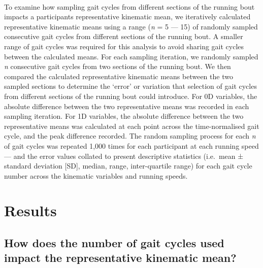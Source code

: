 \documentclass[]{elsarticle} %
\begin{document}
~

To examine how sampling gait cycles from different sections of the
running bout impacts a participants representative kinematic mean, we
iteratively calculated representative kinematic means using a range
(\emph{n} = 5 --- 15) of randomly sampled consecutive gait cycles from
different sections of the running bout. A smaller range of gait cycles
was required for this analysis to avoid sharing gait cycles between the
calculated means. For each sampling iteration, we randomly sampled
\emph{n} consecutive gait cycles from two sections of the running bout.
We then compared the calculated representative kinematic means between
the two sampled sections to determine the `error' or variation that
selection of gait cycles from different sections of the running bout
could introduce. For 0D variables, the absolute difference between the
two representative means was recorded in each sampling iteration. For 1D
variables, the absolute difference between the two representative means
was calculated at each point across the time-normalised gait cycle, and
the peak difference recorded. The random sampling process for each
\emph{n} of gait cycles was repeated 1,000 times for each participant at
each running speed --- and the error values collated to present
descriptive statistics (i.e.~mean ± standard deviation {[}SD{]}, median,
range, inter-quartile range) for each gait cycle number across the
kinematic variables and running speeds.

\hypertarget{results}{%
\section{Results}\label{results}}

\hypertarget{how-does-the-number-of-gait-cycles-used-impact-the-representative-kinematic-mean}{%
\subsection{How does the number of gait cycles used impact the
representative kinematic
mean?}\label{how-does-the-number-of-gait-cycles-used-impact-the-representative-kinematic-mean}}

~
\end{document}
